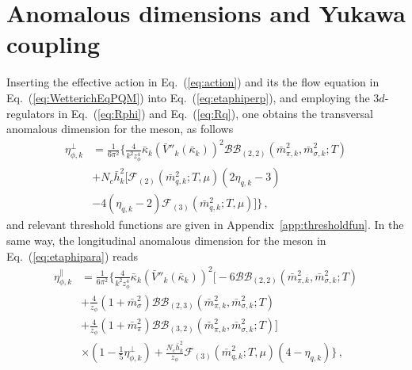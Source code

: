 \documentclass[%
reprint,
superscriptaddress,
showpacs,preprintnumbers,
 amsmath,amssymb,
 aps,
prd,
]{revtex4-1}
\def\Eq#1{Eq.~(\ref{#1})}
\def\app#1{Appendix~\ref{#1}}
\begin{document}
\appendix

\section{Anomalous dimensions and Yukawa coupling}
\label{app:anom}

Inserting the effective action in \Eq{eq:action} and its the flow equation in \Eq{eq:WetterichEqPQM} into \Eq{eq:etaphiperp}, and employing the $3d$- regulators in \Eq{eq:Rphi} and \Eq{eq:Rq}, one obtains the transversal anomalous dimension for the meson, as follows
\begin{align}
  \eta_{\phi,k}^{\perp}&=\frac{1}{6\pi^2}\Bigg\{\frac{4}{k^2 z_\phi^4} \bar{\kappa}_k(\bar{V}''_k(\bar{\kappa}_k))^2\mathcal{BB}_{(2,2)}(\bar{m}^{2}_{\pi,k},\bar{m}^{2}_{\sigma,k};T)\nonumber\\[2ex]
&+N_c\bar{h}^{2}_{k}\bigg[\mathcal{F}_{(2)}(\bar{m}^{2}_{q,k};T,\mu)(2\eta_{q,k}-3)\nonumber\\[2ex]
&-4(\eta_{q,k}-2)\mathcal{F}_{(3)}(\bar{m}^2_{q,k};T,\mu)\bigg]\Bigg\}\,, \label{eq:etaphiperp2}  
\end{align} 
and relevant threshold functions are given in \app{app:thresholdfun}. In the same way, the longitudinal anomalous dimension for the meson in \Eq{eq:etaphipara} reads
\begin{align}
  \eta_{\phi,k}^{\parallel}&=\frac{1}{6\pi^2}\Bigg\{\frac{4}{k^2 z_\phi^4}\bar{\kappa}_k(\bar{V}''_k(\bar{\kappa}_k))^2\bigg[-6\mathcal{BB}_{(2,2)}(\bar{m}^{2}_{\pi,k},\bar{m}^{2}_{\sigma,k};T)\nonumber\\[2ex]
&+\frac{4}{z_\phi}(1+\bar{m}^{2}_{\sigma}){\mathcal{BB}}_{(2,3)}(\bar{m}^{2}_{\pi,k},\bar{m}^{2}_{\sigma,k};T)\nonumber\\[2ex]
&+\frac{4}{z_\phi}(1+\bar{m}^{2}_{\pi}){\mathcal{BB}}_{(3,2)}(\bar{m}^{2}_{\pi,k},\bar{m}^{2}_{\sigma,k};T)\bigg]\nonumber\\[2ex]
&\times(1-\frac{1}{5}\eta^{\bot}_{\phi,k})+\frac{N_c\bar{h}^{2}_{k}}{z_\phi}\mathcal{F}_{(3)}(\bar{m}^{2}_{q,k};T,\mu)(4-\eta_{q,k})\bigg\}\,, \label{eq:etaphipara2}  
\end{align} 
\end{document}
